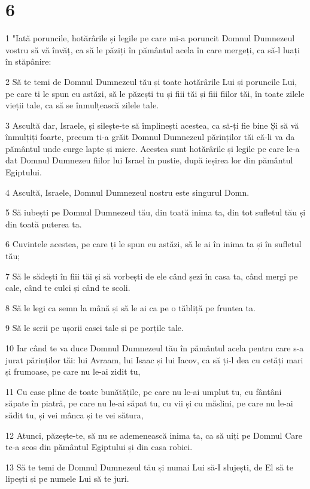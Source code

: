\chapter{6}

\par 1 "Iată poruncile, hotărârile și legile pe care mi-a poruncit Domnul Dumnezeul vostru să vă învăț, ca să le păziți în pământul acela în care mergeți, ca să-l luați în stăpânire:
\par 2 Să te temi de Domnul Dumnezeul tău și toate hotărârile Lui și poruncile Lui, pe care ti le spun eu astăzi, să le păzești tu și fiii tăi și fiii fiilor tăi, în toate zilele vieții tale, ca să se înmulțească zilele tale.
\par 3 Ascultă dar, Israele, și silește-te să împlinești acestea, ca să-ți fie bine Și să vă înmulțiți foarte, precum ți-a grăit Domnul Dumnezeul părinților tăi că-li va da pământul unde curge lapte și miere. Acestea sunt hotărârile și legile pe care le-a dat Domnul Dumnezeu fiilor lui Israel în pustie, după ieșirea lor din pământul Egiptului.
\par 4 Ascultă, Israele, Domnul Dumnezeul nostru este singurul Domn.
\par 5 Să iubești pe Domnul Dumnezeul tău, din toată inima ta, din tot sufletul tău și din toată puterea ta.
\par 6 Cuvintele acestea, pe care ți le spun eu astăzi, să le ai în inima ta și în sufletul tău;
\par 7 Să le sădești în fiii tăi și să vorbești de ele când șezi în casa ta, când mergi pe cale, când te culci și când te scoli.
\par 8 Să le legi ca semn la mână și să le ai ca pe o tăbliță pe fruntea ta.
\par 9 Să le scrii pe ușorii casei tale și pe porțile tale.
\par 10 Iar când te va duce Domnul Dumnezeul tău în pământul acela pentru care s-a jurat părinților tăi: lui Avraam, lui Isaac și lui Iacov, ca să ți-l dea cu cetăți mari și frumoase, pe care nu le-ai zidit tu,
\par 11 Cu case pline de toate bunătățile, pe care nu le-ai umplut tu, cu fântâni săpate în piatră, pe care nu le-ai săpat tu, cu vii și cu măslini, pe care nu le-ai sădit tu, și vei mânca și te vei sătura,
\par 12 Atunci, păzește-te, să nu se ademenească inima ta, ca să uiți pe Domnul Care te-a scos din pământul Egiptului și din casa robiei.
\par 13 Să te temi de Domnul Dumnezeul tău și numai Lui să-I slujești, de El să te lipești și pe numele Lui să te juri.
